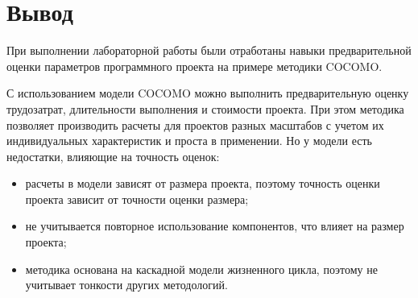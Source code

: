 \section*{Вывод}

При выполнении лабораторной работы были отработаны навыки предварительной оценки параметров программного проекта на примере методики COCOMO.

С использованием модели COCOMO можно выполнить предварительную оценку трудозатрат, длительности выполнения и стоимости проекта. При этом методика позволяет производить расчеты для проектов разных масштабов с учетом их индивидуальных характеристик и проста в применении. Но у модели есть недостатки, влияющие на точность оценок:

\begin{itemize}
	\item расчеты в модели зависят от размера проекта, поэтому точность оценки проекта зависит от точности оценки размера;
	\item не учитывается повторное использование компонентов, что влияет на размер проекта;
	\item методика основана на каскадной модели жизненного цикла, поэтому не учитывает тонкости других методологий.
\end{itemize}
